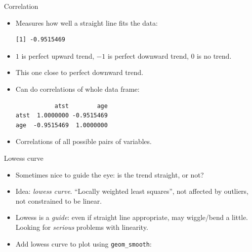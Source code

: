 \begin{frame}[fragile]{Correlation}
  
  \begin{itemize}
  \item Measures how well a straight line fits the data:
 
\begin{knitrout}
\color{fgcolor}\begin{kframe}
\begin{alltt}
\end{alltt}
\begin{verbatim}
[1] -0.9515469
\end{verbatim}
\end{kframe}
\end{knitrout}

\item $1$ is perfect upward trend, $-1$ is perfect downward trend, 0
  is no trend.
\item This one close to perfect downward trend.
\item Can do correlations of whole data frame:
 
\begin{knitrout}
\color{fgcolor}\begin{kframe}
\begin{alltt}
\end{alltt}
\begin{verbatim}
           atst        age
atst  1.0000000 -0.9515469
age  -0.9515469  1.0000000
\end{verbatim}
\end{kframe}
\end{knitrout}
\item Correlations of all possible pairs of variables.  
    
  \end{itemize}
  
\end{frame}


\begin{frame}[fragile]{Lowess curve}
  
  \begin{itemize}
  \item Sometimes nice to guide the eye: is the trend straight, or not?

  \item Idea: \emph{lowess curve}. ``Locally weighted least squares'',
    not affected by outliers, not constrained to be linear.
  \item Lowess is a \emph{guide}: even if straight line appropriate,
    may wiggle/bend a little. Looking for \emph{serious} problems with
    linearity. 
  \item Add lowess curve to plot using \texttt{geom\_smooth}:
 
    
  \end{itemize}
  
\end{frame}


